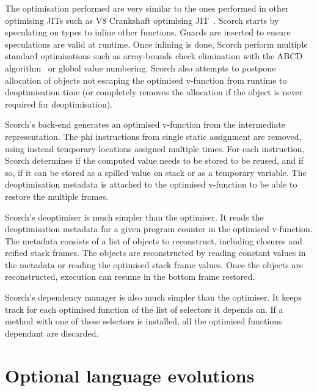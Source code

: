 \documentclass[a4paper,12pt,twoside]{../includes/ThesisStyle}
\begin{document}
The optimisation performed are very similar to the ones performed in other optimising JITs such as V8 Crankshaft optimising JIT~\cite{V8}. Scorch starts by speculating on types to inline other functions. Guards are inserted to ensure speculations are valid at runtime. Once inlining is done, Scorch perform multiple standard optimisations such as array-bounds check elimination with the ABCD algorithm~\cite{Bodi00a} or global value numbering. Scorch also attempts to postpone allocation of objects not escaping the optimised v-function from runtime to deoptimisation time (or completely removes the allocation if the object is never required for deoptimisation).

Scorch's back-end generates an optimised v-function from the intermediate representation. The phi instructions from single static assignment are removed, using instead temporary locations assigned multiple times. For each instruction, Scorch determines if the computed value needs to be stored to be reused, and if so, if it can be stored as a spilled value on stack or as a temporary variable. The deoptimisation metadata is attached to the optimised v-function to be able to restore the multiple frames.

Scorch's deoptimiser is much simpler than the optimiser. It reads the deoptimisation metadata for a given program counter in the optimised v-function. The metadata consists of a list of objects to reconstruct, including closures and reified stack frames. The objects are reconstructed by reading constant values in the metadata or reading the optimised stack frame values. Once the objects are reconstructed, execution can resume in the bottom frame restored.

Scorch's dependency manager is also much simpler than the optimiser. It keeps track for each optimised function of the list of selectors it depends on. If a method with one of these selectors is installed, all the optimised functions dependant are discarded. 


\section{Optional language evolutions}
\end{document}
